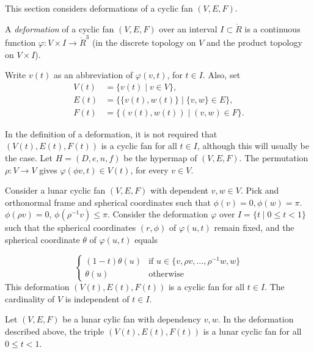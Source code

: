This section considers deformations of a cyclic fan $(V,E,F)$.

\begin{definition}[deformation]
A {\it deformation} of a cyclic fan $(V,E,F)$ over an interval $I\subset\ring{R}$
is a 
continuous function $\varphi:V\times I \to\ring{R}^3$ (in the discrete topology on $V$ and the product topology on $V\times I$).
\end{definition}

Write $v(t)$ as an abbreviation of $\varphi(v,t)$, for $t\in I$.  
Also, set
$$
\begin{array}{lll}
V(t)&=\{v(t) \mid v\in V\},\\
E(t)&=\{\{v(t),w(t)\}\mid \{v,w\}\in E\},\\
F(t)&= \{(v(t),w(t)) \mid  (v,w)\in F\}.
\end{array}
$$


In the definition of a deformation, it is not required that $(V(t),E(t),F(t))$ is a cyclic fan for all $t\in I$, although this will usually be the case.  Let $H=(D,e,n,f)$ be the hypermap of $(V,E,F)$.  The permutation $\rho:V\to V$ gives $\varphi(\phi v,t)\in V(t)$, for every $v\in V$.  


\begin{example}
Consider a lunar cyclic fan $(V,E,F)$ with dependent $v,w\in V$.   Pick and orthonormal frame and spherical coordinates such that $\phi(v)=0,\phi(w)=\pi$.  $\phi(\rho v)=0$, $\phi(\rho^{-1} v)\le\pi$.  Consider the deformation $\varphi$ over 
$I = \{t \mid 0 \le t < 1\}$
such that the spherical coordinates $(r,\phi)$  of $\varphi(u,t)$ remain fixed,
and the spherical coordinate $\theta$ of $\varphi(u,t)$ equals

$$
\begin{cases} 
   (1-t) \theta(u) & \text{if } u\in \{v,\rho v,\ldots, \rho^{-1} w, w\}\\
   \theta(u) & \text{otherwise}
\end{cases}
$$
This deformation $(V(t),E(t),F(t))$ is a cyclic fan for all $t\in I$.
The cardinality of $V$ is independent of $t\in I$.
\end{example}

\begin{lemma} Let $(V,E,F)$ be a lunar cylic fan with dependency $v,w$.  In the deformation described above, the triple $(V(t),E(t),F(t))$ is a lunar cyclic fan for all $0\le t< 1$.
\end{lemma}

